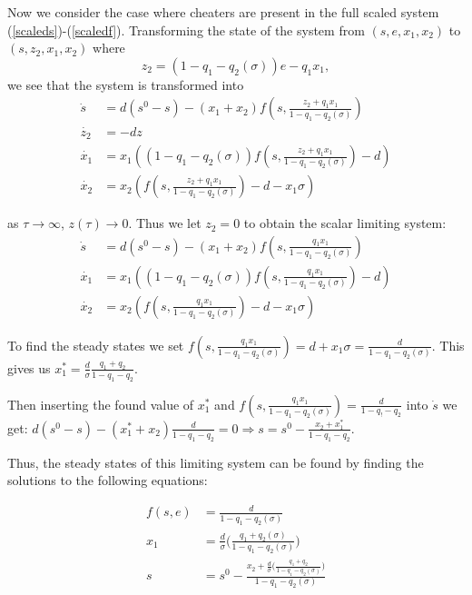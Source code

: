 \documentclass[12pt]{article}
\begin{document}
\pagebreak

\noindent Now we consider the case where cheaters are present in the full scaled system (\ref{scaleds})-(\ref{scaledf}). Transforming the state of the system from $(s,e,x_1,x_2)$ to $(s,z_2,x_1,x_2)$ where $$z_2=(1-q_1-q_2(\sigma ))e-q_1x_1,$$ we see that the system is transformed into
\begin{align*}
\dot{s}&=d(s^0-s)-(x_1+x_2)f(s,\frac{z_2+q_1 x_1}{1-q_1-q_2(\sigma )})\\
\dot{z_2}&=-dz\\
\dot{x_1}&=x_1((1-q_1-q_2(\sigma ))f(s,{\frac{z_2+q_1 x_1}{1-q_1-q_2(\sigma )}})-d)\\
\dot{x_2}&=x_2(f(s,{\frac{z_2+q_1 x_1}{1-q_1-q_2(\sigma )}})-d-x_1 \sigma)
\end{align*}

\noindent as $\tau \rightarrow \infty$, $z(\tau )\rightarrow 0$. Thus we let $z_2=0$ to obtain the scalar limiting system: 
\begin{align}
\dot{s}&=d(s^0-s)-(x_1+x_2)f(s,\frac{q_1 x_1}{1-q_1-q_2(\sigma )})\\
\dot{x_1}&=x_1((1-q_1-q_2(\sigma ))f(s,\frac{q_1 x_1}{1-q_1-q_2(\sigma )})-d)\\
\dot{x_2}&=x_2(f(s,\frac{q_1 x_1}{1-q_1-q_2(\sigma )})-d-x_1 \sigma)
\end{align}

\noindent To find the steady states we set $f(s,\frac{q_1 x_1}{1-q_1-q_2(\sigma )})=d+x_1 \sigma = \frac{d}{1-q_1-q_2(\sigma )}$. This gives us $x_1^*=\frac{d}{\sigma}\frac{q_1+q_2}{1-q_1-q_2}$. 

\noindent Then inserting the found value of $x_1^*$ and $f(s,\frac{q_1 x_1}{1-q_1-q_2(\sigma )})=\frac{d}{1-q_!-q_2}$ into $\dot{s}$ we get: $d(s^0-s)-(x_1^*+x_2)\frac{d}{1-q_1-q_2}=0 \Rightarrow s=s^0-\frac{x_2+x_1^*}{1-q_1-q_2}$. 

\noindent Thus, the steady states of this limiting system can be found by finding the solutions to the following equations: 

\begin{align*}
f(s,e)&=\frac{d}{1-q_1-q_2(\sigma)}\\
x_1&= \frac{d}{\sigma} \big( \frac{q_1+q_2(\sigma )}{1-q_1-q_2(\sigma )}\big) \\
s &= s^0 - \frac{x_2+\frac{d}{\sigma}\big( \frac{q_1+q_2}{1-q_1-q_2(\sigma )} \big)}{1-q_1-q_2(\sigma )}
\end{align*}
\end{document}
